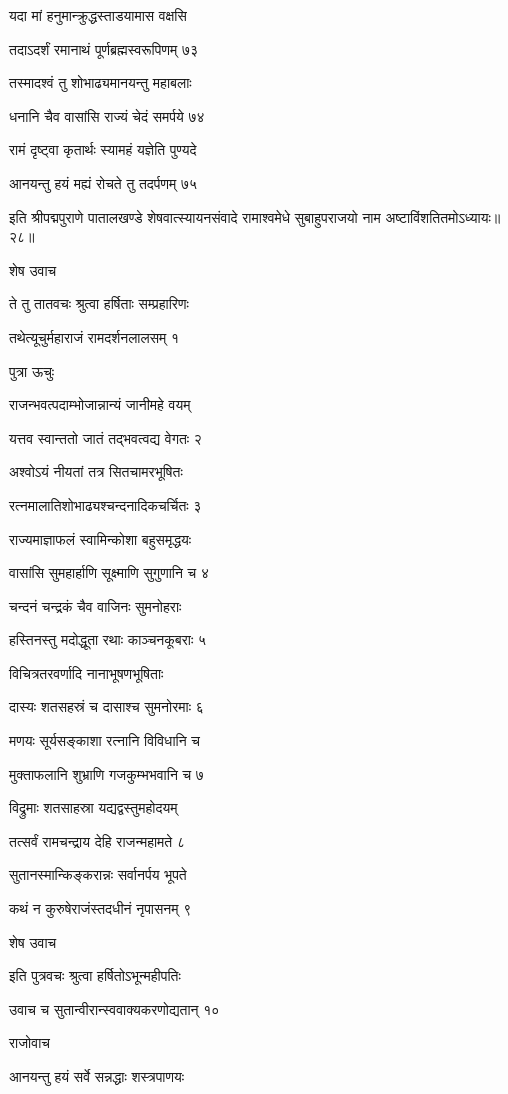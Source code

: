 यदा मां हनुमान्क्रुद्धस्ताडयामास वक्षसि

तदाऽदर्शं रमानाथं पूर्णब्रह्मस्वरूपिणम् ७३

तस्मादश्वं तु शोभाढ्यमानयन्तु महाबलाः

धनानि चैव वासांसि राज्यं चेदं समर्पये ७४

रामं दृष्ट्वा कृतार्थः स्यामहं यज्ञेति पुण्यदे

आनयन्तु हयं मह्यं रोचते तु तदर्पणम् ७५

इति श्रीपद्मपुराणे पातालखण्डे शेषवात्स्यायनसंवादे रामाश्वमेधे सुबाहुपराजयो नाम अष्टाविंशतितमोऽध्यायः॥२८॥


शेष उवाच

ते तु तातवचः श्रुत्वा हर्षिताः सम्प्रहारिणः

तथेत्यूचुर्महाराजं रामदर्शनलालसम् १

पुत्रा ऊचुः

राजन्भवत्पदाम्भोजान्नान्यं जानीमहे वयम्

यत्तव स्वान्ततो जातं तद्भवत्वद्य वेगतः २

अश्वोऽयं नीयतां तत्र सितचामरभूषितः

रत्नमालातिशोभाढ्यश्चन्दनादिकचर्चितः ३

राज्यमाज्ञाफलं स्वामिन्कोशा बहुसमृद्धयः

वासांसि सुमहार्हाणि सूक्ष्माणि सुगुणानि च ४

चन्दनं चन्द्रकं चैव वाजिनः सुमनोहराः

हस्तिनस्तु मदोद्धूता रथाः काञ्चनकूबराः ५

विचित्रतरवर्णादि नानाभूषणभूषिताः

दास्यः शतसहस्रं च दासाश्च सुमनोरमाः ६

मणयः सूर्यसङ्काशा रत्नानि विविधानि च

मुक्ताफलानि शुभ्राणि गजकुम्भभवानि च ७

विद्रुमाः शतसाहस्रा यद्यद्वस्तुमहोदयम्

तत्सर्वं रामचन्द्राय देहि राजन्महामते ८

सुतानस्मान्किङ्करान्नः सर्वानर्पय भूपते

कथं न कुरुषेराजंस्तदधीनं नृपासनम् ९

शेष उवाच

इति पुत्रवचः श्रुत्वा हर्षितोऽभून्महीपतिः

उवाच च सुतान्वीरान्स्ववाक्यकरणोद्यतान् १०

राजोवाच

आनयन्तु हयं सर्वे सन्नद्धाः शस्त्रपाणयः


